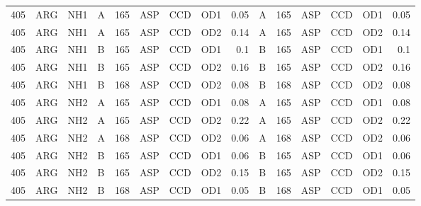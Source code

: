 \begin{longtable}{rlllrlllrlrlllr}
       405 & ARG        & NH1    & A         &         165 & ASP          & CCD         & OD1      &          0.05 & A         &         165 & ASP          & CCD         & OD1      &          0.05 \\
       405 & ARG        & NH1    & A         &         165 & ASP          & CCD         & OD2      &          0.14 & A         &         165 & ASP          & CCD         & OD2      &          0.14 \\
       405 & ARG        & NH1    & B         &         165 & ASP          & CCD         & OD1      &          0.1  & B         &         165 & ASP          & CCD         & OD1      &          0.1  \\
       405 & ARG        & NH1    & B         &         165 & ASP          & CCD         & OD2      &          0.16 & B         &         165 & ASP          & CCD         & OD2      &          0.16 \\
       405 & ARG        & NH1    & B         &         168 & ASP          & CCD         & OD2      &          0.08 & B         &         168 & ASP          & CCD         & OD2      &          0.08 \\
       405 & ARG        & NH2    & A         &         165 & ASP          & CCD         & OD1      &          0.08 & A         &         165 & ASP          & CCD         & OD1      &          0.08 \\
       405 & ARG        & NH2    & A         &         165 & ASP          & CCD         & OD2      &          0.22 & A         &         165 & ASP          & CCD         & OD2      &          0.22 \\
       405 & ARG        & NH2    & A         &         168 & ASP          & CCD         & OD2      &          0.06 & A         &         168 & ASP          & CCD         & OD2      &          0.06 \\
       405 & ARG        & NH2    & B         &         165 & ASP          & CCD         & OD1      &          0.06 & B         &         165 & ASP          & CCD         & OD1      &          0.06 \\
       405 & ARG        & NH2    & B         &         165 & ASP          & CCD         & OD2      &          0.15 & B         &         165 & ASP          & CCD         & OD2      &          0.15 \\
       405 & ARG        & NH2    & B         &         168 & ASP          & CCD         & OD1      &          0.05 & B         &         168 & ASP          & CCD         & OD1      &          0.05 \\

\end{longtable}
